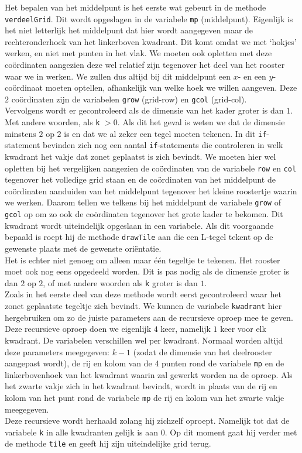 \documentclass[12pt,a4paper]{report}
\begin{document}
Het bepalen van het middelpunt is het eerste wat gebeurt in de methode \texttt{verdeelGrid}. Dit wordt opgeslagen in de variabele \texttt{mp} (middelpunt). Eigenlijk is het niet letterlijk het middelpunt dat hier wordt aangegeven maar de rechteronderhoek van het linkerboven kwadrant. Dit komt omdat we met `hokjes' werken, en niet met punten in het vlak. We moeten ook opletten met deze co\"ordinaten aangezien deze wel relatief zijn tegenover het deel van het rooster waar we in werken. We zullen dus altijd bij dit middelpunt een $x$- en een $y$-co\"ordinaat moeten optellen, afhankelijk van welke hoek we willen aangeven. Deze $2$ co\"ordinaten zijn de variabelen \texttt{grow} (grid-row) en \texttt{gcol} (grid-col).\\
Vervolgens wordt er gecontroleerd als de dimensie van het kader groter is dan $1$. Met andere woorden, als \texttt{k} $> 0$. Als dit het geval is weten we dat de dimensie minstens $2$ op $2$ is en dat we al zeker een tegel moeten tekenen. In dit \texttt{if}-statement bevinden zich nog een aantal \texttt{if}-statements die controleren in welk kwadrant het vakje dat zonet geplaatst is zich bevindt. We moeten hier wel opletten bij het vergelijken aangezien de co\"ordinaten van de variabele \texttt{row} en \texttt{col} tegenover het volledige grid staan en de co\"ordinaten van het middelpunt de co\"ordinaten aanduiden van het middelpunt tegenover het kleine roostertje waarin we werken. Daarom tellen we telkens bij het middelpunt de variabele \texttt{grow} of \texttt{gcol} op om zo ook de co\"ordinaten tegenover het grote kader te bekomen. Dit kwadrant wordt uiteindelijk opgeslaan in een variabele. Als dit voorgaande bepaald is roept hij de methode \texttt{drawTile} aan die een L-tegel tekent op de gewenste plaats met de gewenste ori\"entatie.\\
Het is echter niet genoeg om alleen maar \'e\'en tegeltje te tekenen. Het rooster moet ook nog eens opgedeeld worden. Dit is pas nodig als de dimensie groter is dan $2$ op $2$, of met andere woorden als \texttt{k} groter is dan $1$.\\
Zoals in het eerste deel van deze methode wordt eerst gecontroleerd waar het zonet geplaatste tegeltje zich bevindt. We kunnen de variabele \texttt{kwadrant} hier hergebruiken om zo de juiste parameters aan de recursieve oproep mee te geven. Deze recursieve oproep doen we eigenlijk $4$ keer, namelijk $1$ keer voor elk kwadrant. De variabelen verschillen wel per kwadrant. Normaal worden altijd deze parameters meegegeven: $k-1$ (zodat de dimensie van het deelrooster aangepast wordt), de rij en kolom van de 4 punten rond de variabele \texttt{mp} en de linkerbovenhoek van het kwadrant waarin zal gewerkt worden na de oproep. Als het zwarte vakje zich in het kwadrant bevindt, wordt in plaats van de rij en kolom van het punt rond de variabele \texttt{mp} de rij en kolom van het zwarte vakje meegegeven.\\
Deze recursieve wordt herhaald zolang hij zichzelf oproept. Namelijk tot dat de variabele \texttt{k} in alle kwadranten gelijk is aan $0$. Op dit moment gaat hij verder met de methode \texttt{tile} en geeft hij zijn uiteindelijke grid terug.
\end{document}
